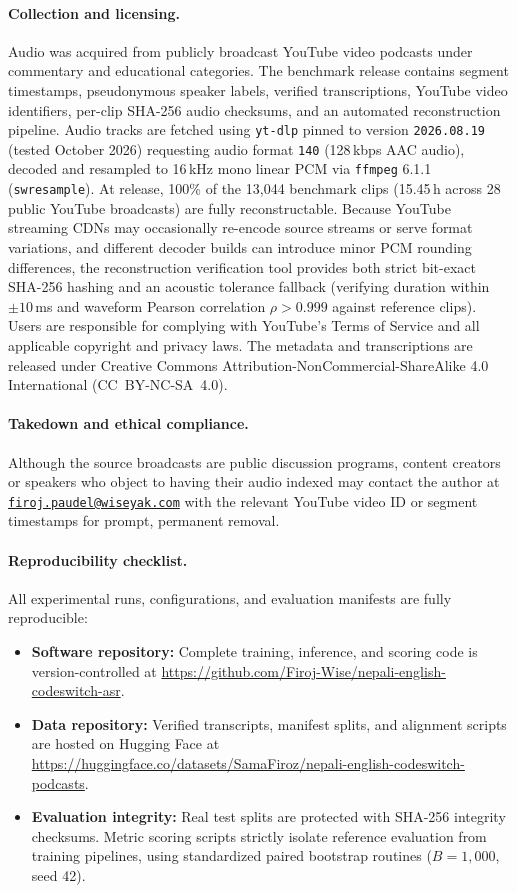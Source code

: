 \documentclass[10pt,twocolumn,a4paper]{article}
\begin{document}
\paragraph{Collection and licensing.}
Audio was acquired from publicly broadcast YouTube video podcasts under commentary and educational categories. The benchmark release contains segment timestamps, pseudonymous speaker labels, verified transcriptions, YouTube video identifiers, per-clip SHA-256 audio checksums, and an automated reconstruction pipeline. Audio tracks are fetched using \texttt{yt-dlp} pinned to version \texttt{2026.08.19} (tested October 2026) requesting audio format \texttt{140} (128\,kbps AAC audio), decoded and resampled to 16\,kHz mono linear PCM via \texttt{ffmpeg} 6.1.1 (\texttt{swresample}). At release, 100\% of the 13,044 benchmark clips (15.45\,h across 28 public YouTube broadcasts) are fully reconstructable. Because YouTube streaming CDNs may occasionally re-encode source streams or serve format variations, and different decoder builds can introduce minor PCM rounding differences, the reconstruction verification tool provides both strict bit-exact SHA-256 hashing and an acoustic tolerance fallback (verifying duration within $\pm 10$\,ms and waveform Pearson correlation $\rho > 0.999$ against reference clips). Users are responsible for complying with YouTube's Terms of Service and all applicable copyright and privacy laws. The metadata and transcriptions are released under Creative Commons Attribution-NonCommercial-ShareAlike 4.0 International (CC~BY-NC-SA~4.0).

\paragraph{Takedown and ethical compliance.}
Although the source broadcasts are public discussion programs, content creators or speakers who object to having their audio indexed may contact the author at \href{mailto:firoj.paudel@wiseyak.com}{\texttt{firoj.paudel@wiseyak.com}} with the relevant YouTube video ID or segment timestamps for prompt, permanent removal.

\paragraph{Reproducibility checklist.}
All experimental runs, configurations, and evaluation manifests are fully reproducible:
\begin{itemize}[nosep,leftmargin=1.2em,topsep=1pt]
  \item \textbf{Software repository:} Complete training, inference, and scoring code is version-controlled at \url{https://github.com/Firoj-Wise/nepali-english-codeswitch-asr}.
  \item \textbf{Data repository:} Verified transcripts, manifest splits, and alignment scripts are hosted on Hugging Face at \url{https://huggingface.co/datasets/SamaFiroz/nepali-english-codeswitch-podcasts}.
  \item \textbf{Evaluation integrity:} Real test splits are protected with SHA-256 integrity checksums. Metric scoring scripts strictly isolate reference evaluation from training pipelines, using standardized paired bootstrap routines ($B=1{,}000$, seed 42).
\end{itemize}
\end{document}
